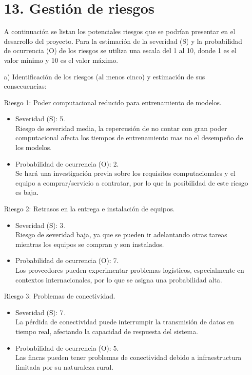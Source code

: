\documentclass[
11pt, %
]{charter}
\begin{document}
\section{13. Gestión de riesgos}
\label{sec:riesgos}

A continuación se listan los potenciales riesgos que se podrían presentar en el desarrollo del proyecto. Para la estimación de la severidad (S) y la probabilidad de ocurrencia (O) de los riesgos se utiliza una escala del 1 al 10, donde 1 es el valor mínimo y 10 es el valor máximo.

a) Identificación de los riesgos (al menos cinco) y estimación de sus consecuencias:
 
Riesgo 1: Poder computacional reducido para entrenamiento de modelos.
\begin{itemize}
	\item Severidad (S): 5. \\
	Riesgo de severidad media, la repercusión de no contar con gran poder computacional afecta los tiempos de entrenamiento mas no el desempeño de los modelos.
	\item Probabilidad de ocurrencia (O): 2. \\
	Se hará una investigación previa sobre los requisitos computacionales y el equipo a comprar/servicio a contratar, por lo que la posibilidad de este riesgo es baja.
\end{itemize}   

Riesgo 2: Retrasos en la entrega e instalación de equipos.
\begin{itemize}
	\item Severidad (S): 3. \\
	Riesgo de severidad baja, ya que se pueden ir adelantando otras tareas mientras los equipos se compran y son instalados.
	\item Probabilidad de ocurrencia (O): 7. \\
	Los proveedores pueden experimentar problemas logísticos, especialmente en contextos internacionales, por lo que se asigna una probabilidad alta.
\end{itemize}

Riesgo 3: Problemas de conectividad.
\begin{itemize}
	\item Severidad (S):  7.\\
	La pérdida de conectividad puede interrumpir la transmisión de datos en tiempo real, afectando la capacidad de respuesta del sistema.
	\item Probabilidad de ocurrencia (O): 5.\\
	Las fincas pueden tener problemas de conectividad debido a infraestructura limitada por su naturaleza rural.
\end{itemize}
\end{document}
